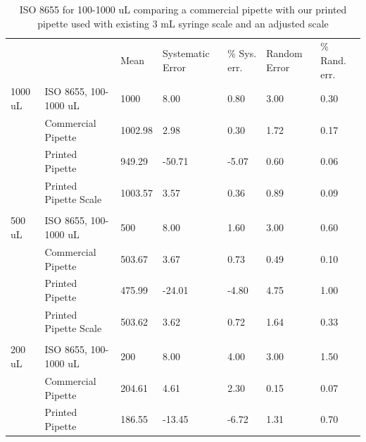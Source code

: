 \documentclass[10pt,letterpaper]{article}
\begin{document}
\begin{table}[!ht]
\begin{adjustwidth}{-2.25in}{0in} %
\centering
\caption{ISO 8655 for 100-1000 uL comparing a commercial pipette with our printed pipette used with existing 3 mL syringe scale and an adjusted scale}
\label{table1}
\begin{tabular}{lllllll}
        &                       & Mean   & Systematic Error & \% Sys. err. & Random Error & \% Rand. err. \\
1000 uL & ISO 8655, 100-1000 uL & 1000    & 8.00             & 0.80         & 3.00         & 0.30          \\
        & Commercial Pipette    & 1002.98 & 2.98             & 0.30         & 1.72         & 0.17          \\
        & Printed Pipette       & 949.29  & -50.71           & -5.07        & 0.60         & 0.06          \\
        & Printed Pipette Scale & 1003.57 & 3.57             & 0.36         & 0.89         & 0.09          \\
        &                       &         &                  &              &              &               \\
500 uL  & ISO 8655, 100-1000 uL & 500     & 8.00             & 1.60         & 3.00         & 0.60          \\
        & Commercial Pipette    & 503.67  & 3.67             & 0.73         & 0.49         & 0.10          \\
        & Printed Pipette       & 475.99  & -24.01           & -4.80        & 4.75         & 1.00          \\
        & Printed Pipette Scale & 503.62  & 3.62             & 0.72         & 1.64         & 0.33          \\
        &                       &         &                  &              &              &               \\
200 uL  & ISO 8655, 100-1000 uL & 200     & 8.00             & 4.00         & 3.00         & 1.50          \\
        & Commercial Pipette    & 204.61  & 4.61             & 2.30         & 0.15         & 0.07          \\
        & Printed Pipette       & 186.55  & -13.45           & -6.72        & 1.31         & 0.70          \\

\end{tabular}
\end{adjustwidth}
\end{table}
\end{document}
